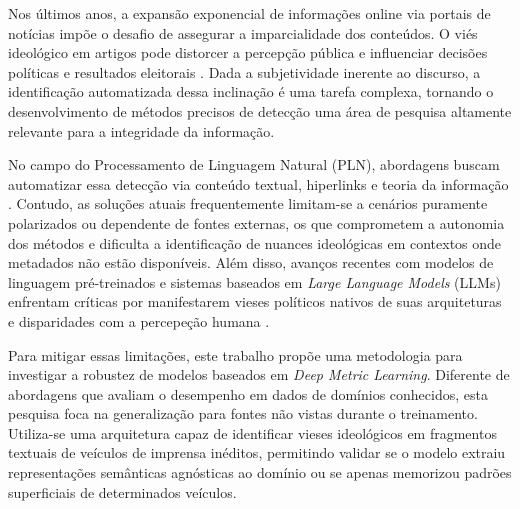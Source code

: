Nos últimos anos, a expansão exponencial de informações online via portais de notícias impõe o desafio de assegurar a imparcialidade dos conteúdos. 
O viés ideológico em artigos pode distorcer a percepção pública e influenciar decisões políticas e resultados eleitorais \cite{gentzkow2006media, chiang2011media}. 
Dada a subjetividade inerente ao discurso, a identificação automatizada dessa inclinação é uma tarefa complexa, tornando o desenvolvimento de métodos precisos de detecção uma área 
de pesquisa altamente relevante para a integridade da informação.

No campo do Processamento de Linguagem Natural (PLN), abordagens buscam automatizar essa detecção via conteúdo textual, hiperlinks e teoria da informação \cite{spinde2022neural,patricia2019link}. 
Contudo, as soluções atuais frequentemente limitam-se a cenários puramente polarizados ou dependente de fontes externas, os que comprometem a autonomia dos métodos e dificulta 
a identificação de nuances ideológicas em contextos onde metadados não estão disponíveis. Além disso, avanços recentes com modelos de linguagem pré-treinados e sistemas baseados em \textit{Large Language Models} (LLMs) \cite{lin2024indivec}
enfrentam críticas por manifestarem vieses políticos nativos de suas arquiteturas e disparidades com a percepeção humana \cite{lin-etal-2025-investigating}.

Para mitigar essas limitações, este trabalho propõe uma metodologia para investigar a robustez de modelos baseados em \textit{Deep Metric Learning}. Diferente de abordagens que avaliam o desempenho em dados de domínios conhecidos, esta pesquisa 
foca na generalização para fontes não vistas durante o treinamento. Utiliza-se uma arquitetura capaz de identificar vieses ideológicos em fragmentos textuais de veículos de imprensa inéditos, permitindo validar se o modelo extraiu representações 
semânticas agnósticas ao domínio ou se apenas memorizou padrões superficiais de determinados veículos.